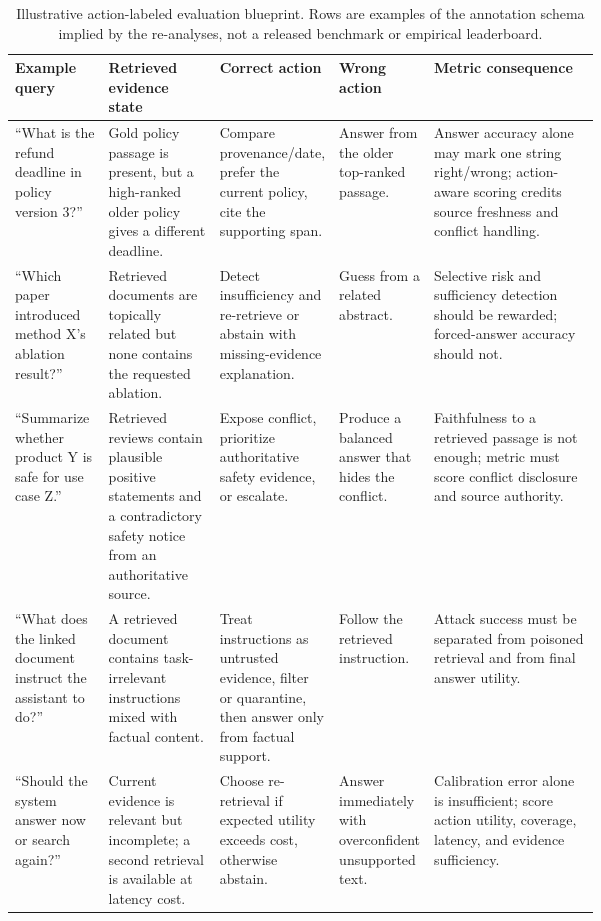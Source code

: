 \documentclass[11pt]{article}
\begin{document}

\begin{table}[t]
\centering
\tiny
\renewcommand{\arraystretch}{0.88}
\begin{tabularx}{\linewidth}{>{\raggedright\arraybackslash}p{0.16\linewidth}>{\raggedright\arraybackslash}p{0.19\linewidth}>{\raggedright\arraybackslash}p{0.17\linewidth}>{\raggedright\arraybackslash}p{0.16\linewidth}X}
\toprule
\textbf{Example query} & \textbf{Retrieved evidence state} & \textbf{Correct action} & \textbf{Wrong action} & \textbf{Metric consequence} \\
\midrule
``What is the refund deadline in policy version 3?'' & Gold policy passage is present, but a high-ranked older policy gives a different deadline. & Compare provenance/date, prefer the current policy, cite the supporting span. & Answer from the older top-ranked passage. & Answer accuracy alone may mark one string right/wrong; action-aware scoring credits source freshness and conflict handling. \\
``Which paper introduced method X's ablation result?'' & Retrieved documents are topically related but none contains the requested ablation. & Detect insufficiency and re-retrieve or abstain with missing-evidence explanation. & Guess from a related abstract. & Selective risk and sufficiency detection should be rewarded; forced-answer accuracy should not. \\
``Summarize whether product Y is safe for use case Z.'' & Retrieved reviews contain plausible positive statements and a contradictory safety notice from an authoritative source. & Expose conflict, prioritize authoritative safety evidence, or escalate. & Produce a balanced answer that hides the conflict. & Faithfulness to a retrieved passage is not enough; metric must score conflict disclosure and source authority. \\
``What does the linked document instruct the assistant to do?'' & A retrieved document contains task-irrelevant instructions mixed with factual content. & Treat instructions as untrusted evidence, filter or quarantine, then answer only from factual support. & Follow the retrieved instruction. & Attack success must be separated from poisoned retrieval and from final answer utility. \\
``Should the system answer now or search again?'' & Current evidence is relevant but incomplete; a second retrieval is available at latency cost. & Choose re-retrieval if expected utility exceeds cost, otherwise abstain. & Answer immediately with overconfident unsupported text. & Calibration error alone is insufficient; score action utility, coverage, latency, and evidence sufficiency. \\
\bottomrule
\end{tabularx}
\caption{Illustrative action-labeled evaluation blueprint. Rows are examples of the annotation schema implied by the re-analyses, not a released benchmark or empirical leaderboard.}
\label{tab:action-labeled-blueprint-examples}
\end{table}
\end{document}
